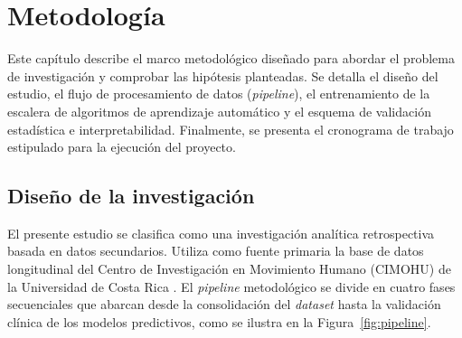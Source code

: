 \documentclass[../tesis.tex]{subfiles}
\begin{document}
\chapter{Metodología}
\label{cap:metodologia}

Este capítulo describe el marco metodológico diseñado para abordar el problema de investigación y comprobar las hipótesis planteadas. Se detalla el diseño del estudio, el flujo de procesamiento de datos (\textit{pipeline}), el entrenamiento de la escalera de algoritmos de aprendizaje automático y el esquema de validación estadística e interpretabilidad. Finalmente, se presenta el cronograma de trabajo estipulado para la ejecución del proyecto.

\section{Diseño de la investigación}
\label{sec:diseno_investigacion}

El presente estudio se clasifica como una investigación analítica retrospectiva basada en datos secundarios. Utiliza como fuente primaria la base de datos longitudinal del Centro de Investigación en Movimiento Humano (CIMOHU) de la Universidad de Costa Rica \cite{CIMOHUdb2026}. El \textit{pipeline} metodológico se divide en cuatro fases secuenciales que abarcan desde la consolidación del \textit{dataset} hasta la validación clínica de los modelos predictivos, como se ilustra en la Figura~\ref{fig:pipeline}.
\end{document}
